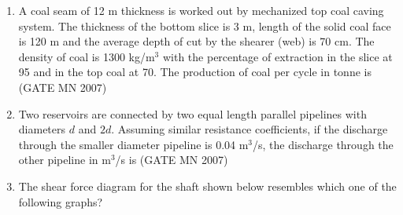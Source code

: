 \documentclass[journal]{IEEEtran}
\begin{document}
\begin{enumerate}
\item A coal seam of 12 m thickness is worked out by mechanized top coal caving system. The thickness of the bottom slice is 3 m, length of the solid coal face is 120 m and the average depth of cut by the shearer (web) is 70 cm. The density of coal is 1300 kg/m$^3$ with the percentage of extraction in the slice at 95 and in the top coal at 70. The production of coal per cycle in tonne is 
	\hfill (GATE MN 2007)
\begin{enumerate}
\end{enumerate}


\item Two reservoirs are connected by two equal length parallel pipelines with diameters $d$ and $2d$. Assuming similar resistance coefficients, if the discharge through the smaller diameter pipeline is 0.04 m$^3$/s, the discharge through the other pipeline in m$^3$/s is 
	\hfill (GATE MN 2007)
\begin{enumerate}
\end{enumerate}


\item The shear force diagram for the shaft shown below resembles which one of the following graphs?  


\end{enumerate}
\end{document}
